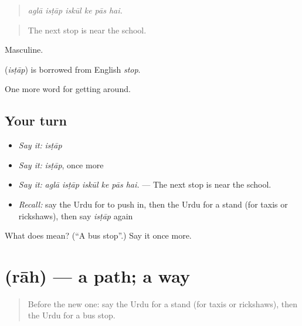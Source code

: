 \begin{quote}
     
\end{quote}

\begin{quote}
\emph{aglā isṭāp iskūl ke pās hai.}
\end{quote}

\begin{quote}
The next stop is near the school.
\end{quote}

Masculine.

\begin{cousinweb}
\textbf{} (\emph{isṭāp}) is borrowed from English \emph{stop}.
\end{cousinweb}

\begin{grammarlens}[title={What you've built}]
One more word for getting around.
\end{grammarlens}

\subsection*{Your turn}
\begin{itemize}
\raggedright
  \item \emph{Say it:} \emph{isṭāp}
  \item \emph{Say it:} \emph{isṭāp}, once more
  \item \emph{Say it:} \emph{aglā isṭāp iskūl ke pās hai.} — The next stop is near the school.
  \item \emph{Recall:} say the Urdu for to push in, then the Urdu for a stand (for taxis or rickshaws), then say \emph{isṭāp} again
\end{itemize}

\begin{tcolorbox}[breakable,colback=teal!4,colframe=teal!35!black,title={Before you move on}]
What does  mean? (\textquotedblleft{}A bus stop\textquotedblright{}.) Say it once more.
\end{tcolorbox}
\section[\texorpdfstring{\ur{راہ} (rāh)}{راہ (rāh)}]{ (rāh) — a path; a way}

\label{lesson:UR-C392-rah}



\begin{quote}
Before the new one: say the Urdu for a stand (for taxis or rickshaws), then the Urdu for a bus stop.
\end{quote}

